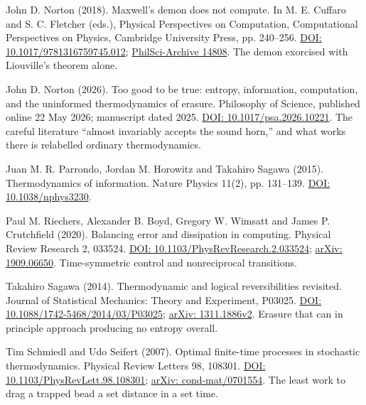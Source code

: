 \documentclass[11pt,twoside]{article}
\theoremstyle{thielethm}
\theoremstyle{thieledef}
\theoremstyle{thieledef}
\theoremstyle{thieledef}
\theoremstyle{thielethm}
\theoremstyle{thieleobs}
\theoremstyle{thielethm}
\begin{document}
\noindent John D. Norton (2018). Maxwell's demon does not compute. In M. E. Cuffaro and S. C. Fletcher (eds.), Physical Perspectives on Computation, Computational Perspectives on Physics, Cambridge University Press, pp. 240--256. \href{https://doi.org/10.1017/9781316759745.012}{DOI: 10.1017/9781316759745.012}; \href{https://philsci-archive.pitt.edu/14808/}{PhilSci-Archive 14808}. The demon exorcised with Liouville's theorem alone.
\par\medskip

\noindent John D. Norton (2026). Too good to be true: entropy, information, computation, and the uninformed thermodynamics of erasure. Philosophy of Science, published online 22 May 2026; manuscript dated 2025. \href{https://doi.org/10.1017/psa.2026.10221}{DOI: 10.1017/psa.2026.10221}. The careful literature ``almost invariably accepts the sound horn,'' and what works there is relabelled ordinary thermodynamics.
\par\medskip

\noindent Juan M. R. Parrondo, Jordan M. Horowitz and Takahiro Sagawa (2015). Thermodynamics of information. Nature Physics 11(2), pp. 131--139. \href{https://doi.org/10.1038/nphys3230}{DOI: 10.1038/nphys3230}.
\par\medskip

\noindent Paul M. Riechers, Alexander B. Boyd, Gregory W. Wimsatt and James P. Crutchfield (2020). Balancing error and dissipation in computing. Physical Review Research 2, 033524. \href{https://doi.org/10.1103/PhysRevResearch.2.033524}{DOI: 10.1103/PhysRevResearch.2.033524}; \href{https://arxiv.org/abs/1909.06650}{arXiv: 1909.06650}. Time-symmetric control and nonreciprocal transitions.
\par\medskip

\noindent Takahiro Sagawa (2014). Thermodynamic and logical reversibilities revisited. Journal of Statistical Mechanics: Theory and Experiment, P03025. \href{https://doi.org/10.1088/1742-5468/2014/03/P03025}{DOI: 10.1088/1742-5468/2014/03/P03025}; \href{https://arxiv.org/abs/1311.1886v2}{arXiv: 1311.1886v2}. Erasure that can in principle approach producing no entropy overall.
\par\medskip

\noindent Tim Schmiedl and Udo Seifert (2007). Optimal finite-time processes in stochastic thermodynamics. Physical Review Letters 98, 108301. \href{https://doi.org/10.1103/PhysRevLett.98.108301}{DOI: 10.1103/PhysRevLett.98.108301}; \href{https://arxiv.org/abs/cond-mat/0701554}{arXiv: cond-mat/0701554}. The least work to drag a trapped bead a set distance in a set time.
\par\medskip
\end{document}
